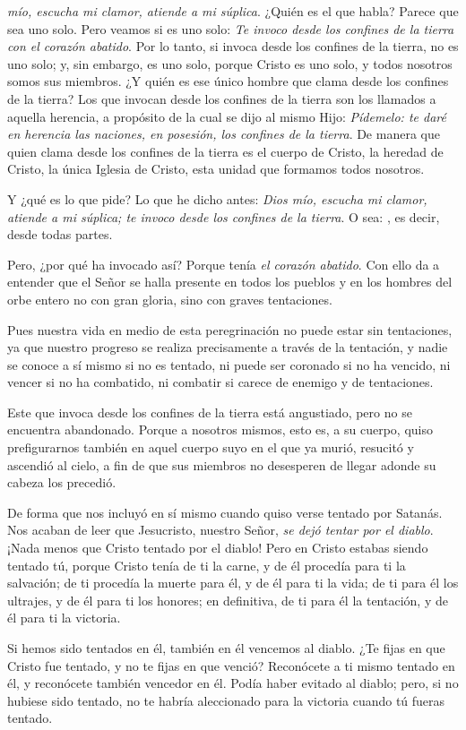 \begin{body}
 \textit{mío, escucha mi clamor, atiende a mi súplica}. ¿Quién es el que habla? Parece que sea uno solo. Pero veamos si es uno solo: \textit{Te invoco desde los confines de la tierra con el corazón abatido}. Por lo tanto, si invoca desde los confines de la tierra, no es uno solo; y, sin embargo, es uno solo, porque Cristo es uno solo, y todos nosotros somos sus miembros. ¿Y quién es ese único hombre que clama desde los confines de la tierra? Los que invocan desde los confines de la tierra son los llamados a aquella herencia, a propósito de la cual se dijo al mismo Hijo: \textit{Pídemelo: te daré en herencia las naciones, en posesión, los confines de la tierra}. De manera que quien clama desde los confines de la tierra es el cuerpo de Cristo, la heredad de Cristo, la única Iglesia de Cristo, esta unidad que formamos todos nosotros.

Y ¿qué es lo que pide? Lo que he dicho antes: \textit{Dios mío, escucha mi clamor, atiende a mi súplica; te invoco desde los confines de la tierra}. O sea: , es decir, desde todas partes.

Pero, ¿por qué ha invocado así? Porque tenía \textit{el corazón abatido}. Con ello da a entender que el Señor se halla presente en todos los pueblos y en los hombres del orbe entero no con gran gloria, sino con graves tentaciones.

Pues nuestra vida en medio de esta peregrinación no puede estar sin tentaciones, ya que nuestro progreso se realiza precisamente a través de la tentación, y nadie se conoce a sí mismo si no es tentado, ni puede ser coronado si no ha vencido, ni vencer si no ha combatido, ni combatir si carece de enemigo y de tentaciones.

Este que invoca desde los confines de la tierra está angustiado, pero no se encuentra abandonado. Porque a nosotros mismos, esto es, a su cuerpo, quiso prefigurarnos también en aquel cuerpo suyo en el que ya murió, resucitó y ascendió al cielo, a fin de que sus miembros no desesperen de llegar adonde su cabeza los precedió.

De forma que nos incluyó en sí mismo cuando quiso verse tentado por Satanás. Nos acaban de leer que Jesucristo, nuestro Señor, \textit{se dejó tentar por el diablo}. ¡Nada menos que Cristo tentado por el diablo! Pero en Cristo estabas siendo tentado tú, porque Cristo tenía de ti la carne, y de él procedía para ti la salvación; de ti procedía la muerte para él, y de él para ti la vida; de ti para él los ultrajes, y de él para ti los honores; en definitiva, de ti para él la tentación, y de él para ti la victoria.

Si hemos sido tentados en él, también en él vencemos al diablo. ¿Te fijas en que Cristo fue tentado, y no te fijas en que venció? Reconócete a ti mismo tentado en él, y reconócete también vencedor en él. Podía haber evitado al diablo; pero, si no hubiese sido tentado, no te habría aleccionado para la victoria cuando tú fueras tentado.
\end{body}


